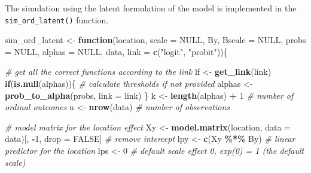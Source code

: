 \documentclass[
  man,floatsintext]{apa6}
\newenvironment{Shaded}{\begin{snugshade}}{\end{snugshade}}
\newcommand{\AttributeTok}[1]{\textcolor[rgb]{0.13,0.29,0.53}{#1}}
\newcommand{\CommentTok}[1]{\textcolor[rgb]{0.56,0.35,0.01}{\textit{#1}}}
\newcommand{\ConstantTok}[1]{\textcolor[rgb]{0.56,0.35,0.01}{#1}}
\newcommand{\ControlFlowTok}[1]{\textcolor[rgb]{0.13,0.29,0.53}{\textbf{#1}}}
\newcommand{\DecValTok}[1]{\textcolor[rgb]{0.00,0.00,0.81}{#1}}
\newcommand{\FunctionTok}[1]{\textcolor[rgb]{0.13,0.29,0.53}{\textbf{#1}}}
\newcommand{\NormalTok}[1]{#1}
\newcommand{\OtherTok}[1]{\textcolor[rgb]{0.56,0.35,0.01}{#1}}
\newcommand{\SpecialCharTok}[1]{\textcolor[rgb]{0.81,0.36,0.00}{\textbf{#1}}}
\newcommand{\StringTok}[1]{\textcolor[rgb]{0.31,0.60,0.02}{#1}}
\begin{document}
\normalsize

\scriptsize

\normalsize

\scriptsize

\normalsize

The simulation using the latent formulation of the model is implemented in the \texttt{sim\_ord\_latent()} function.

\scriptsize

\begin{Shaded}
\begin{Highlighting}[]
\NormalTok{sim\_ord\_latent }\OtherTok{\textless{}{-}} \ControlFlowTok{function}\NormalTok{(location,}
                           \AttributeTok{scale =} \ConstantTok{NULL}\NormalTok{,}
\NormalTok{                           By,}
                           \AttributeTok{Bscale =} \ConstantTok{NULL}\NormalTok{,}
                           \AttributeTok{probs =} \ConstantTok{NULL}\NormalTok{, }
                           \AttributeTok{alphas =} \ConstantTok{NULL}\NormalTok{, }
\NormalTok{                           data, }
                           \AttributeTok{link =} \FunctionTok{c}\NormalTok{(}\StringTok{"logit"}\NormalTok{, }\StringTok{"probit"}\NormalTok{))\{}
  
  \CommentTok{\# get all the correct functions according to the link}
\NormalTok{  lf }\OtherTok{\textless{}{-}} \FunctionTok{get\_link}\NormalTok{(link)}
  \ControlFlowTok{if}\NormalTok{(}\FunctionTok{is.null}\NormalTok{(alphas))\{}
    \CommentTok{\# calculate thresholds if not provided}
\NormalTok{    alphas }\OtherTok{\textless{}{-}} \FunctionTok{prob\_to\_alpha}\NormalTok{(probs, }\AttributeTok{link =}\NormalTok{ link)}
\NormalTok{  \}}
\NormalTok{  k }\OtherTok{\textless{}{-}} \FunctionTok{length}\NormalTok{(alphas) }\SpecialCharTok{+} \DecValTok{1} \CommentTok{\# number of ordinal outcomes}
\NormalTok{  n }\OtherTok{\textless{}{-}} \FunctionTok{nrow}\NormalTok{(data) }\CommentTok{\# number of observations}
  
  \CommentTok{\# model matrix for the location effect}
\NormalTok{  Xy }\OtherTok{\textless{}{-}} \FunctionTok{model.matrix}\NormalTok{(location, }\AttributeTok{data =}\NormalTok{ data)[, }\SpecialCharTok{{-}}\DecValTok{1}\NormalTok{, drop }\OtherTok{=} \ConstantTok{FALSE}\NormalTok{] }\CommentTok{\# remove intercept}
\NormalTok{  lpy }\OtherTok{\textless{}{-}} \FunctionTok{c}\NormalTok{(Xy }\SpecialCharTok{\%*\%}\NormalTok{ By) }\CommentTok{\# linear predictor for the location}
\NormalTok{  lps }\OtherTok{\textless{}{-}} \DecValTok{0} \CommentTok{\# default scale effect 0, exp(0) = 1 (the default scale)}
  

\end{Highlighting}
\end{Shaded}
\end{document}
